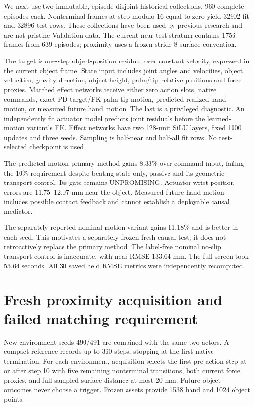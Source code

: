 \documentclass[10 pt]{article}
\begin{document}
We next use two immutable, episode-disjoint historical collections, 960 complete
episodes each. Nonterminal frames at step modulo 16 equal to zero yield 32902 fit
and 32896 test rows. These collections have been used by previous research and are
not pristine Validation data. The current-near test stratum contains 1756 frames
from 639 episodes; proximity uses a frozen stride-8 surface convention.

The target is one-step object-position residual over constant velocity, expressed
in the current object frame. State input includes joint angles and velocities,
object velocities, gravity direction, object height, palm/tip relative positions
and force proxies. Matched effect networks receive either zero action slots, native
commands, exact PD-target/FK palm-tip motion, predicted realized hand motion, or
measured future hand motion. The last is a privileged diagnostic. An independently
fit actuator model predicts joint residuals before the learned-motion variant's FK.
Effect networks have two 128-unit SiLU layers, fixed 1000 updates and three seeds.
Sampling is half-near and half-all fit rows. No test-selected checkpoint is used.

\begin{table}[h]
\centering

\caption{Archived one-step vector prediction error, seed-mean millimeters. Near and all-state strata differ.}
\end{table}

The predicted-motion primary method gains 8.33\% over command input, failing the
10\% requirement despite beating state-only, passive and its geometric transport
control. Its gate remains UNPROMISING. Actuator wrist-position errors are
11.75--12.07 mm near the object. Measured future hand motion includes possible
contact feedback and cannot establish a deployable causal mediator.

The separately reported nominal-motion variant gains 11.18\% and is better in each
seed. This motivates a separately frozen fresh causal test; it does not retroactively
replace the primary method. The label-free nominal no-slip transport control is
inaccurate, with near RMSE 133.64 mm. The full screen took 53.64 seconds. All 30
saved held RMSE metrics were independently recomputed.

\section{Fresh proximity acquisition and failed matching requirement}
New environment seeds 490/491 are combined with the same two actors. A compact
reference records up to 360 steps, stopping at the first native termination.
For each environment, acquisition selects the first pre-action step at or after
step 10 with five remaining nonterminal transitions, both current force proxies,
and full sampled surface distance at most 20 mm. Future object outcomes never
choose a trigger. Frozen assets provide 1538 hand and 1024 object points.
\end{document}
